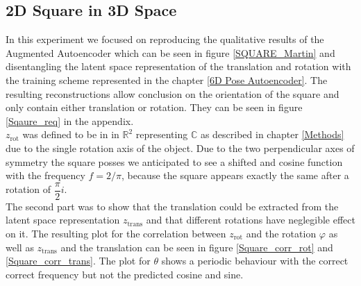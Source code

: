\documentclass[10pt,a4paper]{article}
\newcommand{\rot}{\ensuremath{\text{rot}\xspace}}
\newcommand{\trans}{\ensuremath{\text{trans}\xspace}}
\begin{document}
\subsection{2D Square in 3D Space}\label{Square}
In this experiment we focused on reproducing the qualitative results of the Augmented Autoencoder which can be seen in figure \ref{SQUARE_Martin} and disentangling the latent space representation of the translation and rotation with the training scheme represented in the chapter \ref{6D Pose Autoencoder}. The resulting reconstructions allow conclusion on the orientation of the square and only contain either translation or rotation. They can be seen in figure \ref{Sqaure_req} in the appendix.\\
$z_{\rot}$ was defined to be in in $\mathbb{R}^2$ representing $\mathbb{C}$ as described in chapter \ref{Methods} due to the single rotation axis of the object. Due to the two perpendicular axes of symmetry the square posses we anticipated to see a shifted and cosine function with the frequency $f = 2/ \pi$, because the square appears exactly the same after a rotation of $\dfrac{\pi}{2}i$. \\
The second part was to show that the translation could be extracted from the latent space representation $z_{\trans}$ and that different rotations have neglegible effect on it. The resulting plot for the correlation between $z_{\rot}$ and the rotation $\varphi$ as well as $z_{\trans}$ and the translation can be seen in figure \ref{Square_corr_rot} and \ref{Square_corr_trans}. 
The plot for $\theta$ shows a periodic behaviour with the correct correct frequency but not the predicted cosine and sine.
\end{document}
